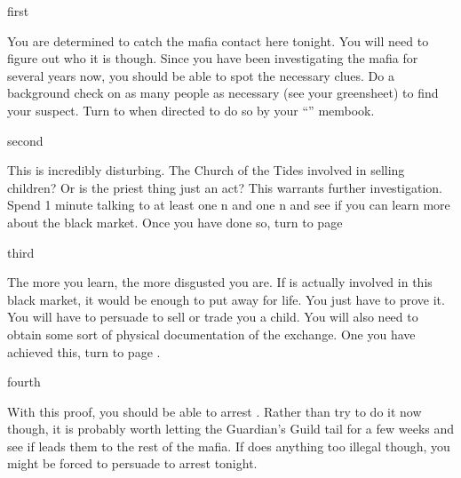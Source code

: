\documentclass[greennotebook]{NeptuneBall}
\begin{document}

\startnotebook{\nMafia{}}

\begin{page}{first}

You are determined to catch the mafia contact here tonight. You will need to figure out who it is though. Since you have been investigating the mafia for several years now, you should be able to spot the necessary clues. Do a background check on as many people as necessary (see your \gBackground{\MYname} greensheet) to find your suspect. Turn to  when directed to do so by your ``\nMafia{\MYname}'' membook.

\end{page}

\begin{page}{second}

This is incredibly disturbing. The Church of the Tides involved in selling children? Or is the priest thing just an act? This warrants further investigation. Spend 1 minute talking to at least one \pAtlantis{}n and one \pPacifica{}n and see if you can learn more about the black market. Once you have done so, turn to page 

\end{page}

\begin{page}{third}

The more you learn, the more disgusted you are. If \cPriest{} is actually involved in this black market, it would be enough to put \cPriest{\them} away for life. You just have to prove it. You will have to persuade \cPriest{} to sell or trade you a child. You will also need to obtain some sort of physical documentation of the exchange. One you have achieved this, turn to page .

\end{page}

\begin{page}{fourth}

With this proof, you should be able to arrest \cPriest{}. Rather than try to do it now though, it is probably worth letting the Guardian's Guild tail  for a few  weeks and see if \cPriest{} leads them to the rest of the mafia. If \cPriest{} does anything too illegal though, you might be forced to persuade \cKing{} to arrest \cPriest{} tonight.

\end{page}

\endnotebook
\end{document}
